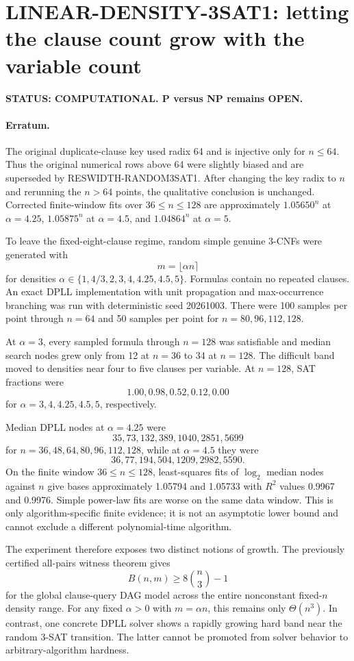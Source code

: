 \section*{LINEAR-DENSITY-3SAT1: letting the clause count grow with the variable count}

\textbf{STATUS: COMPUTATIONAL. P versus NP remains OPEN.}

\paragraph{Erratum.}
The original duplicate-clause key used radix 64 and is injective only for \(n\le64\).
Thus the original numerical rows above 64 were slightly biased and are superseded by
RESWIDTH-RANDOM3SAT1. After changing the key radix to \(n\) and rerunning the
\(n>64\) points, the qualitative conclusion is unchanged. Corrected finite-window fits
over \(36\le n\le128\) are approximately \(1.05650^n\) at \(\alpha=4.25\),
\(1.05875^n\) at \(\alpha=4.5\), and \(1.04864^n\) at \(\alpha=5\).

To leave the fixed-eight-clause regime, random simple genuine 3-CNFs were generated with
\[
m=\lfloor \alpha n\rceil
\]
for densities \(\alpha\in\{1,4/3,2,3,4,4.25,4.5,5\}\). Formulas contain no repeated
clauses. An exact DPLL implementation with unit propagation and max-occurrence branching
was run with deterministic seed 20261003. There were 100 samples per point through
\(n=64\) and 50 samples per point for \(n=80,96,112,128\).

At \(\alpha=3\), every sampled formula through \(n=128\) was satisfiable and median
search nodes grew only from 12 at \(n=36\) to 34 at \(n=128\). The difficult band moved
to densities near four to five clauses per variable. At \(n=128\), SAT fractions were
\[
1.00, 0.98, 0.52, 0.12, 0.00
\]
for \(\alpha=3,4,4.25,4.5,5\), respectively.

Median DPLL nodes at \(\alpha=4.25\) were
\[
35,73,132,389,1040,2851,5699
\]
for \(n=36,48,64,80,96,112,128\), while at \(\alpha=4.5\) they were
\[
36,77,194,504,1209,2982,5590.
\]
On the finite window \(36\le n\le128\), least-squares fits of \(\log_2\) median nodes
against \(n\) give bases approximately 1.05794 and 1.05733 with \(R^2\) values
0.9967 and 0.9976. Simple power-law fits are worse on the same data window. This is only
algorithm-specific finite evidence; it is not an asymptotic lower bound and cannot exclude
a different polynomial-time algorithm.

The experiment therefore exposes two distinct notions of growth. The previously certified
all-pairs witness theorem gives
\[
B(n,m)\ge 8\binom n3-1
\]
for the global clause-query DAG model across the entire nonconstant fixed-\(n\) density
range. For any fixed \(\alpha>0\) with \(m=\alpha n\), this remains only
\(\Theta(n^3)\). In contrast, one concrete DPLL solver shows a rapidly growing hard band
near the random 3-SAT transition. The latter cannot be promoted from solver behavior to
arbitrary-algorithm hardness.

